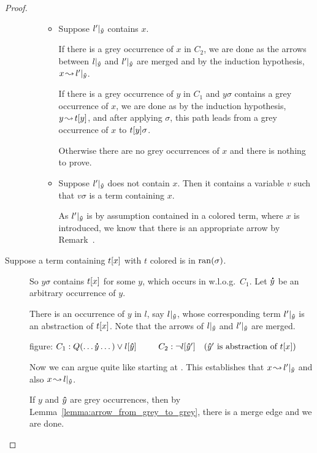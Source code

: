 \documentclass[,%
	paper=a4,%
	DIV11, %
	twoside=false,%
	liststotoc,
	bibtotoc,
	draft=false,%
	numbers=noendperiod
]{scrartcl}
\begin{document}
\begin{proof}
\begin{description}
\begin{itemize}
						\markC
						\begin{itemize}
							\item 
								Suppose $l'|_{\bm\hat y}$ contains $x$. 

								If there is a grey occurrence of $x$ in $C_2$, we are done as the arrows between $l|_{\bm\hat y}$ and $l'|_{\bm\hat y}$ are merged and by the induction hypothesis, $x \operatorname{\leadsto} l'|_{\bm\hat y}$.

								If there is a grey occurrence of $y$ in $C_1$ and $y\sigma$ contains a grey occurrence of $x$, we are done as by the induction hypothesis, $y \operatorname{\leadsto} t[y]$,
								and after applying $\sigma$, this path leads from a grey occurrence of $x$ to $t[y]\sigma$.

								Otherwise there are no grey occurrences of $x$ and there is nothing to prove.

							\item 
								Suppose $l'|_{\bm\hat y}$ does not contain $x$.
								Then it contains a variable $v$ such that $v\sigma$ is a term containing $x$.
								

								As $l'|_{\bm\hat y}$ is by assumption contained in a colored term, where $x$ is introduced, we know that there is an appropriate arrow by Remark~\substremarkref.


						\end{itemize}
				\end{itemize}

			\item [Suppose a term containing $t[x]$ with $t$ colored is in $\operatorname{ran}(\sigma)$.]
				So $y\sigma$ contains $t[x]$ for some $y$, which occurs in w.l.o.g.\ $C_1$.
				Let $\bm\dot y$ be an arbitrary occurrence of $y$.

				There is an occurrence of $y$ in $l$, say $l|_{\bm\hat y}$, whose corresponding term $l'|_{\bm\hat y}$ is an abstraction of $t[x]$. Note that the arrows of $l|_{\bm\hat y}$ and $l'|_{\bm\hat y}$ are merged.

				figure:
				$C_1: Q(\dots \bdot y \dots) \lor l\occ{\bhat y}\quad\quad$
				$C_2: \lnot l[\bm\hat y']\quad(\bm\hat y' \text{ is abstraction of } t[x])$

				Now we can argue quite like starting at \markC.
				This establishes that $x \operatorname{\leadsto} l'|_{\bm\hat y}$ and also $x \operatorname{\leadsto} l|_{\bm\hat y}$.

				If $y$ and $\bm\hat y$ are grey occurrences, then by Lemma~\ref{lemma:arrow_from_grey_to_grey}, there is a merge edge and we are done.


\end{description}
\end{proof}
\end{document}
